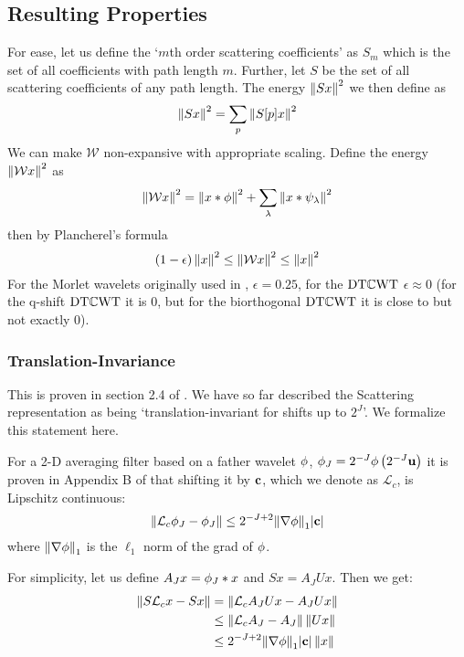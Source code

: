\subsection{Resulting Properties}
For ease, let us define the `$m$th order scattering coefficients' as $S_m$ which
is the set of all coefficients with path length $m$. Further, let $S$ be the set
of all scattering coefficients of any path length. The energy $\left\lVert Sx \right\rVert^2$ we
then define as
\begin{equation}
  \left\lVert Sx \right\rVert^2 = \sum_p \left\lVert S[p]x \right\rVert^2
\end{equation}
We can make $\mathcal{W}$ non-expansive with appropriate scaling. Define the energy $\left\lVert \mathcal{W}x \right\rVert^2$ as
\begin{equation}
  \left\lVert \mathcal{W}x \right\rVert^2 = \left\lVert x\ast \phi \right\rVert^2 + \sum_\lambda \left\lVert x \ast
  \psi_\lambda \right\rVert^2
\end{equation}
then by Plancherel's formula
\begin{equation}
  (1-\epsilon)\left\lVert x \right\rVert^2 \leq \left\lVert \mathcal{W}x \right\rVert^2 \leq \left\lVert x \right\rVert^2
\end{equation}
For the Morlet wavelets originally used in \cite{bruna_invariant_2013},
$\epsilon=0.25$, for the $\mathrm{DT}\mathbb{C}\mathrm{WT}$ $\epsilon \approx 0$ (for the q-shift $\mathrm{DT}\mathbb{C}\mathrm{WT}$
it is 0, but for the biorthogonal $\mathrm{DT}\mathbb{C}\mathrm{WT}$ it is close to but not exactly 0).

\subsubsection{Translation-Invariance}
\newcommand{\shift}{\mathcal{L}_c}

This is proven in section 2.4 of \cite{mallat_group_2012}. We
have so far described the Scattering representation as being `translation-invariant
for shifts up to $2^J$'. We formalize this statement here.

For a 2-D averaging filter based on a father wavelet $\phi$,
$\phi_J = 2^{-J}\phi\left(2^{-J}\mathbf{u}\right)$ it is proven in Appendix B of
\cite{mallat_group_2012} that shifting
it by $\mathbf{c}$, which we denote as $\mathcal{L}_c$, is Lipschitz continuous:
\begin{equation}
  \norm{\shift \phi_J - \phi_J} \leq 2^{-J+2}\lnorm{\nabla \phitd}{1}|\bmu{c}|
\end{equation}
where ${\left\lVert \nabla \phi \right\rVert}_{1}$ is the $\ell_1$ norm of the grad of $\phi$.

For simplicity, let us define $A_J x = \phi_J \ast x$ and $Sx = A_J Ux$. Then we get:
\begin{align}
  \norm{S\shift x - Sx} & = \norm{\shift A_J Ux - A_J Ux} \\
                         &\leq \norm{\shift A_J - A_J}\norm{Ux} \\
                         & \leq 2^{-J+2}\lnorm{\nabla \phitd}{1}|\bmu{c}|\norm{x}
\end{align}

